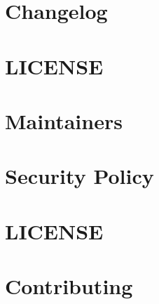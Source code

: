 \documentclass[twoside]{book}
\newcommand{\+}{\discretionary{\mbox{\scriptsize$\hookleftarrow$}}{}{}}
\begin{document}
\chapter{Changelog}
\label{md__c__workspace__proyecto__p_h_p_project_vendor_slim_slim__c_h_a_n_g_e_l_o_g}

\chapter{LICENSE}
\label{md__c__workspace__proyecto__p_h_p_project_vendor_slim_slim__l_i_c_e_n_s_e}

\chapter{Maintainers}
\label{md__c__workspace__proyecto__p_h_p_project_vendor_slim_slim__m_a_i_n_t_a_i_n_e_r_s}

\chapter{Security Policy}
\label{md__c__workspace__proyecto__p_h_p_project_vendor_slim_slim__s_e_c_u_r_i_t_y}

\chapter{LICENSE}
\label{md__c__workspace__proyecto__p_h_p_project_vendor_slim_twig_view__l_i_c_e_n_s_e}

\chapter{Contributing}
\label{md__c__workspace__proyecto__p_h_p_project_vendor_squizlabs_php_codesniffer__c_o_n_t_r_i_b_u_t_i_n_g}

\end{document}
